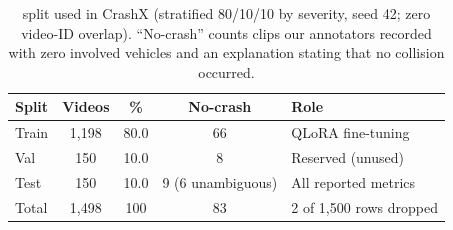 \begin{table}[!t]
\centering
\caption{\dataset{} split used in CrashX (stratified 80/10/10 by severity, seed 42; zero video-ID overlap). ``No-crash'' counts clips our annotators recorded with zero involved vehicles and an explanation stating that no collision occurred.}
\label{tab:dataset}
\small
\begin{tabular}{@{}lcccl@{}}
\toprule
\textbf{Split} & \textbf{Videos} & \textbf{\%} & \textbf{No-crash} & \textbf{Role} \\
\midrule
Train & 1{,}198 & 80.0 & 66 & QLoRA fine-tuning \\
Val   & 150    & 10.0 & 8  & Reserved (unused) \\
Test  & 150    & 10.0 & 9 (6 unambiguous) & All reported metrics \\
\midrule
Total & 1{,}498 & 100 & 83 & 2 of 1{,}500 rows dropped \\
\bottomrule
\end{tabular}
\end{table}
